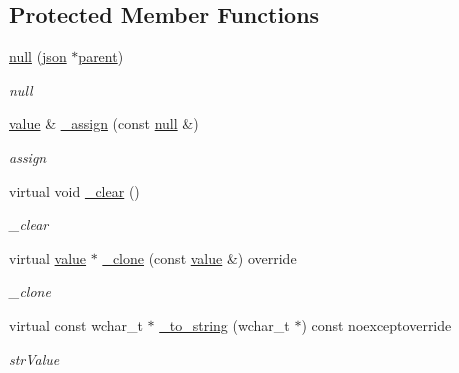 \subsection*{Protected Member Functions}
\begin{DoxyCompactItemize}
\item 
\hyperlink{classformat_1_1null_aeaec053f34742b73ceee29fa52c89a07}{null} (\hyperlink{classformat_1_1json}{json} $\ast$\hyperlink{classformat_1_1value_a86c03ec8810bfd0d60ec49095120040d}{parent})
\begin{DoxyCompactList}\small\item\em null \end{DoxyCompactList}\item 
\hyperlink{classformat_1_1value_aa6b85823936bf7b8ab78d3f8d443c00d}{value} \& \hyperlink{classformat_1_1null_a78e3069d06d7d7b96601119e4c940013}{\+\_\+assign} (const \hyperlink{classformat_1_1null}{null} \&)
\begin{DoxyCompactList}\small\item\em assign \end{DoxyCompactList}\item 
virtual void \hyperlink{classformat_1_1null_a0ee1ca6d5fa2957d7000e8673b6c4168}{\+\_\+clear} ()\hypertarget{classformat_1_1null_a0ee1ca6d5fa2957d7000e8673b6c4168}{}\label{classformat_1_1null_a0ee1ca6d5fa2957d7000e8673b6c4168}

\begin{DoxyCompactList}\small\item\em \+\_\+clear \end{DoxyCompactList}\item 
virtual \hyperlink{classformat_1_1value_aa6b85823936bf7b8ab78d3f8d443c00d}{value} $\ast$ \hyperlink{classformat_1_1null_ae43d32571c3b127c43ac4f588cfa9b6a}{\+\_\+clone} (const \hyperlink{classformat_1_1value_aa6b85823936bf7b8ab78d3f8d443c00d}{value} \&) override
\begin{DoxyCompactList}\small\item\em \+\_\+clone \end{DoxyCompactList}\item 
virtual const wchar\+\_\+t $\ast$ \hyperlink{classformat_1_1null_a8c85176815e031702c5487573b07ffac}{\+\_\+to\+\_\+string} (wchar\+\_\+t $\ast$) const noexceptoverride
\begin{DoxyCompactList}\small\item\em str\+Value \end{DoxyCompactList}\end{DoxyCompactItemize}
